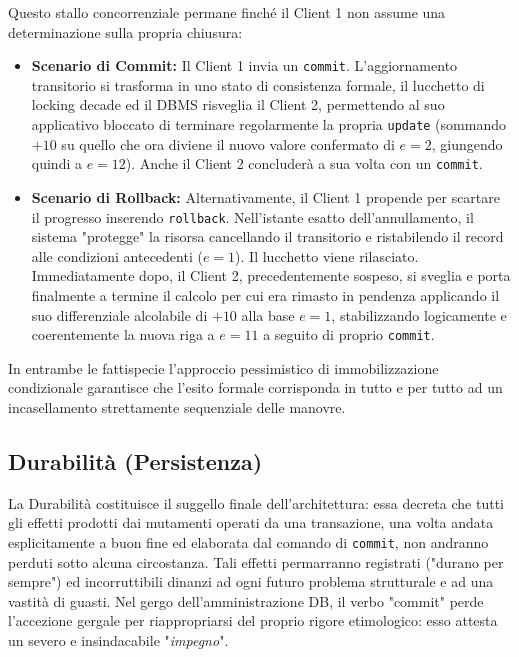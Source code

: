 Questo stallo concorrenziale permane finché il Client 1 non assume una determinazione sulla propria chiusura:
\begin{itemize}
    \item \textbf{Scenario di Commit:} Il Client 1 invia un \texttt{commit}. L'aggiornamento transitorio si trasforma in uno stato di consistenza formale, il lucchetto di locking decade ed il DBMS risveglia il Client 2, permettendo al suo applicativo bloccato di terminare regolarmente la propria \texttt{update} (sommando $+10$ su quello che ora diviene il nuovo valore confermato di $e=2$, giungendo quindi a $e=12$). Anche il Client 2 concluderà a sua volta con un \texttt{commit}.
    \item \textbf{Scenario di Rollback:} Alternativamente, il Client 1 propende per scartare il progresso inserendo \texttt{rollback}. Nell'istante esatto dell'annullamento, il sistema "protegge" la risorsa cancellando il transitorio e ristabilendo il record alle condizioni antecedenti ($e=1$). Il lucchetto viene rilasciato. Immediatamente dopo, il Client 2, precedentemente sospeso, si sveglia e porta finalmente a termine il calcolo per cui era rimasto in pendenza applicando il suo differenziale alcolabile di $+10$ alla base $e=1$, stabilizzando logicamente e coerentemente la nuova riga a $e=11$ a seguito di proprio \texttt{commit}.
\end{itemize}

In entrambe le fattispecie l'approccio pessimistico di immobilizzazione condizionale garantisce che l'esito formale corrisponda in tutto e per tutto ad un incasellamento strettamente sequenziale delle manovre.

\subsection{Durabilità (Persistenza)}

La Durabilità costituisce il suggello finale dell'architettura: essa decreta che tutti gli effetti prodotti dai mutamenti operati da una transazione, una volta andata esplicitamente a buon fine ed elaborata dal comando di \texttt{commit}, non andranno perduti sotto alcuna circostanza. Tali effetti permarranno registrati ("durano per sempre") ed incorruttibili dinanzi ad ogni futuro problema strutturale e ad una vastità di guasti. Nel gergo dell'amministrazione DB, il verbo "commit" perde l'accezione gergale per riappropriarsi del proprio rigore etimologico: esso attesta un severo e insindacabile "\textit{impegno}".

